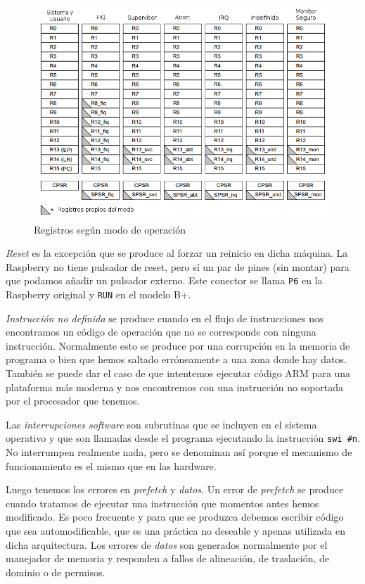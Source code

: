 \begin{figure}[h]
  \centering
    \includegraphics[width=14cm]{graphs/tablaregistros.png}
  \caption{Registros según modo de operación}
  \label{fig:tablareg}
\end{figure}

{\it Reset} es la excepción que se produce al forzar un reinicio en dicha máquina. La
Raspberry no tiene pulsador de reset, pero sí un par de pines (sin montar) para que podamos
añadir un pulsador externo. Este conector se llama {\tt P6} en la Raspberry original y
{\tt RUN} en el modelo B+.

{\it Instrucción no definida} se produce cuando en el flujo de instrucciones nos encontramos
un código de operación que no se corresponde con ninguna instrucción. Normalmente esto se
produce por una corrupción en la memoria de programa o bien que hemos saltado erróneamente
a una zona donde hay datos. También se puede dar el caso de que intentemos ejecutar código
ARM para una plataforma más moderna y nos encontremos con una instrucción no soportada por el
procesador que tenemos.

Las {\it interrupciones software} son subrutinas que se incluyen en el
sistema operativo y que son llamadas desde el programa ejecutando la
instrucción {\tt swi \#n}. No interrumpen realmente nada, pero se
denominan así porque el mecanismo de funcionamiento es el mismo que en
las hardware.

Luego tenemos los errores en {\it prefetch} y {\it datos}. Un error de {\it prefetch} se produce
cuando tratamos de ejecutar una instrucción que momentos antes hemos modificado. Es poco
frecuente y para que se produzca debemos escribir código que sea automodificable, que es
una práctica no deseable y apenas utilizada en dicha arquitectura. Los errores de {\it datos}
son generados normalmente por el manejador de memoria y responden a fallos de alineación, de
traslación, de dominio o de permisos.

